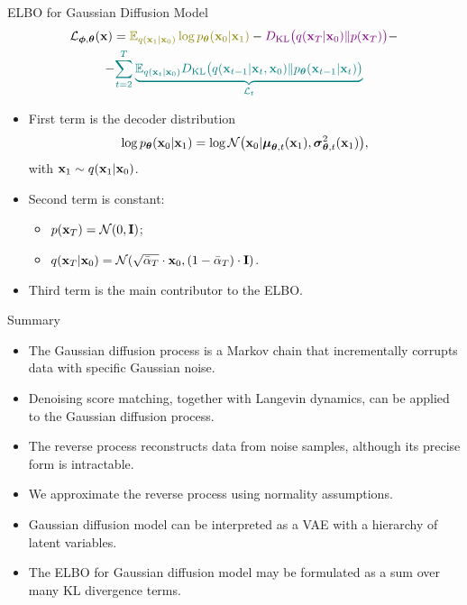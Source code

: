 \documentclass{beamer}
\renewcommand{\eqpause}{}
\begin{document}
\begin{frame}{ELBO for Gaussian Diffusion Model}
        \vspace{-0.5cm}
        \begin{multline*}
            \cL_{\bphi, \btheta}(\bx) =  {\color{olive}\bbE_{q(\bx_1 | \bx_0)} \log \pt(\bx_0 | \bx_1)} - {\color{violet}\KL\bigl(q(\bx_T | \bx_0) \| p(\bx_T)\bigr)} - \\
            - {\color{teal}\sum_{t=2}^T \underbrace{ \bbE_{q(\bx_t | \bx_0)} \KL \bigl(q(\bx_{t-1} | \bx_t, \bx_0) \| \pt(\bx_{t-1} | \bx_t)\bigr)}_{\cL_t}}
        \end{multline*}
        \vspace{-0.5cm}
    \eqpause
    \begin{itemize}
        \item {\color{olive}First term} is the decoder distribution
        \[
            \log p_{\boldsymbol{\theta}}(\mathbf{x}_0 | \mathbf{x}_1) = \log \mathcal{N} \bigl(\mathbf{x}_0 | \boldsymbol{\mu}_{\boldsymbol{\theta}, t}(\mathbf{x}_1), \boldsymbol{\sigma}_{\boldsymbol{\theta}, t}^2(\mathbf{x}_1)\bigr),
        \] 
        with $\mathbf{x}_1 \sim q(\mathbf{x}_1 | \mathbf{x}_0)$.
        \eqpause
        \item {\color{violet}Second term} is constant: 
        \begin{itemize}
            \item $p(\mathbf{x}_T) = \mathcal{N}(0, \mathbf{I})$;
            \item $q(\mathbf{x}_T | \mathbf{x}_0) = \mathcal{N}(\sqrt{\bar{\alpha}_T} \cdot \mathbf{x}_0, (1 - \bar{\alpha}_T) \cdot \mathbf{I})$.
        \end{itemize}
        \eqpause
        \item {\color{teal}Third term} is the main contributor to the ELBO.
    \end{itemize}
\end{frame}
\begin{frame}{Summary}
	\begin{itemize}
		\item The Gaussian diffusion process is a Markov chain that incrementally corrupts data with specific Gaussian noise.
		\vfill
		\item Denoising score matching, together with Langevin dynamics, can be applied to the Gaussian diffusion process.
		\vfill
		\item The reverse process reconstructs data from noise samples, although its precise form is intractable.
        \vfill 
        \item We approximate the reverse process using normality assumptions.     
        \vfill
        \item Gaussian diffusion model can be interpreted as a VAE with a hierarchy of latent variables.
        \vfill
        \item The ELBO for Gaussian diffusion model may be formulated as a sum over many KL divergence terms.
	\end{itemize}
\end{frame}
\end{document}
